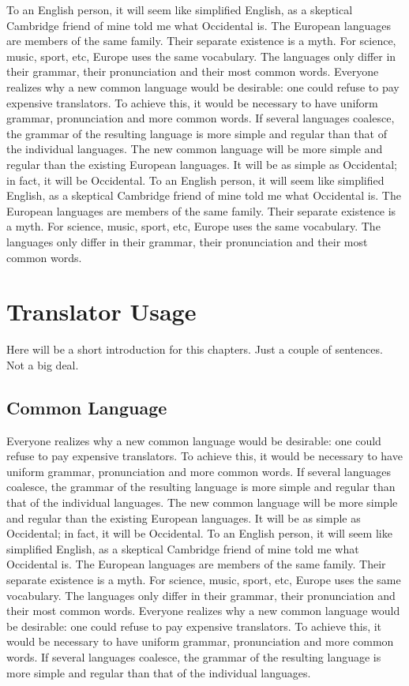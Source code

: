 To an English person, it will seem like simplified English, as a skeptical Cambridge friend of mine told me what Occidental is. The European languages are members of the same family. Their separate existence is a myth. For science, music, sport, etc, Europe uses the same vocabulary. The languages only differ in their grammar, their pronunciation and their most common words. Everyone realizes why a new common language would be desirable: one could refuse to pay expensive translators. To achieve this, it would be necessary to have uniform grammar, pronunciation and more common words. If several languages coalesce, the grammar of the resulting language is more simple and regular than that of the individual languages. The new common language will be more simple and regular than the existing European languages. It will be as simple as Occidental; in fact, it will be Occidental. To an English person, it will seem like simplified English, as a skeptical Cambridge friend of mine told me what Occidental is. The European languages are members of the same family. Their separate existence is a myth. For science, music, sport, etc, Europe uses the same vocabulary. The languages only differ in their grammar, their pronunciation and their most common words.

\pagebreak 

\chapter{Translator Usage}
\label{translatorusage}

Here will be a short introduction for this chapters. Just a couple of sentences. Not a big deal.

\section{Common Language}
\label{commonlanguage}

Everyone realizes why a new common language would be desirable: one could refuse to pay expensive translators. To achieve this, it would be necessary to have uniform grammar, pronunciation and more common words. If several languages coalesce, the grammar of the resulting language is more simple and regular than that of the individual languages. The new common language will be more simple and regular than the existing European languages. It will be as simple as Occidental; in fact, it will be Occidental. To an English person, it will seem like simplified English, as a skeptical Cambridge friend of mine told me what Occidental is. The European languages are members of the same family. Their separate existence is a myth. For science, music, sport, etc, Europe uses the same vocabulary. The languages only differ in their grammar, their pronunciation and their most common words. Everyone realizes why a new common language would be desirable: one could refuse to pay expensive translators. To achieve this, it would be necessary to have uniform grammar, pronunciation and more common words. If several languages coalesce, the grammar of the resulting language is more simple and regular than that of the individual languages.

